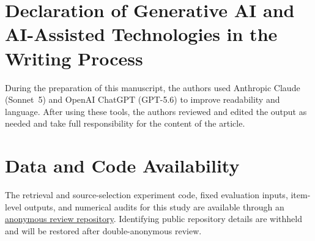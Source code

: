 \documentclass[pdflatex,sn-basic]{sn-jnl}%
\theoremstyle{thmstyleone}%
\theoremstyle{thmstyletwo}%
\theoremstyle{thmstylethree}%
\begin{document}
\FloatBarrier

\section*{Declaration of Generative AI and AI-Assisted Technologies in the
Writing Process}

During the preparation of this manuscript, the authors used Anthropic Claude
(\mbox{Sonnet~5}) and OpenAI ChatGPT (GPT-5.6) to improve readability and language.
After using these tools, the authors reviewed and edited the output as needed
and take full responsibility for the content of the article.

\section*{Data and Code Availability}

The retrieval and source-selection experiment code, fixed evaluation inputs,
item-level outputs, and numerical audits for this study are available through an
\href{https://anonymous.4open.science/r/Retrieval-and-Source-Selection-Failures-in-Indian-Statutory-Question-Answering-5B24/}{anonymous review repository}.
Identifying public repository details are withheld and will be restored after
double-anonymous review.


\begingroup
\setlength{\bibsep}{0.35em} %
\endgroup
\end{document}
